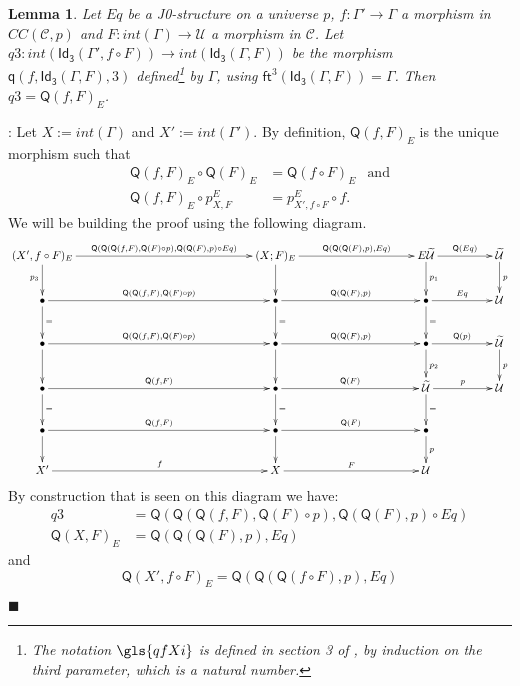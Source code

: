 \documentclass[12pt]{article}
\numberwithin{equation}{section}
\newenvironment{myproof}{{\bf Proof}:}{$\blacksquare$ \vskip 5mm }
\newtheorem{lemma}[proposition]{Lemma}
\newcommand{\sr}{\rightarrow}
\newcommand{\wt}{\widetilde}
\newcommand{\BB}{{\bullet}}
\newcommand{\toCC}{CC} %
\newcommand{\C}{{\mathcal C}}  %
\newcommand{\ft}{\mathsf{ft}}
\newcommand{\q}{\mathsf{q}}
\newcommand{\Idx}{\mathsf{Id_3}} %
\newcommand{\U}{\mathcal{U}}
\newcommand{\Q}{\mathsf{Q}}
\begin{document}
\begin{lemma}
\label{2015.04.04.l4} Let $Eq$ be a J0-structure on a universe $p$,
$f:\Gamma'\sr \Gamma$ a morphism in $\toCC({\C},p)$ and $F:int(\Gamma)\sr \U$ a morphism in $\C$.
Let $q3:int(\Idx(\Gamma',f\circ F))\sr int(\Idx(\Gamma,F))$ be the morphism $\q(f,\Idx(\Gamma,F),3)$ defined\footnote{The notation $\gls{qfXi}$
is defined in section 3 of \cite{Csubsystems}, by induction on the third parameter, which is a natural number.} by
$\Gamma$, using $\ft^3(\Idx(\Gamma,F))=\Gamma$.  Then $q3=\Q(f,F)_{E}$.
\end{lemma}
%
\begin{myproof}
Let $X:=int(\Gamma)$ and $X':=int(\Gamma')$. By definition, $\Q(f,F)_{E}$ is the
unique morphism such that
%
\begin{align*}
  \Q(f,F)_{E}\circ \Q(F)_{E}&=\Q(f\circ F)_{E} & \text{and} \\
  \Q(f,F)_{E}\circ p^{E}_{X,F}&=p^{E}_{X',f\circ F}\circ f.
\end{align*}
%
We will be building the proof using the following diagram.
%
$$
\begin{xy}
          \xymatrix@C=4pc{ (X',f\circ F)_{E} \ar[rrr]^-{\Q(\Q(\Q(f,F),\Q(F)\circ
              p),\Q(\Q(F),p)\circ Eq)} \ar[d]_{p_3} &&& (X;F)_{E}
            \ar[rr]^-{\Q(\Q(\Q(F),p),Eq)} \ar[d] && E\wt{\U} \ar[r]^-{\Q(Eq)}
            \ar[d]^{p_1} & \wt{\U} \ar[d]^{p}\\ \BB
            \ar[rrr]^-{\Q(\Q(f,F),\Q(F)\circ p)} \ar[d]^{=} &&& \BB
            \ar[rr]^-{\Q(\Q(F),p)} \ar[d]^{=} && \BB \ar[r]^-{Eq} \ar[d]^{=}&
            \U\\ \BB \ar[rrr]^-{\Q(\Q(f,F),\Q(F)\circ p)} \ar[d] &&& \BB
            \ar[rr]^-{\Q(\Q(F),p)} \ar[d] && \BB \ar[r]^-{\Q(p)} \ar[d]^{p_2}&
            \wt{\U} \ar[d]^{p}\\ \BB \ar[rrr]^-{\Q(f,F)} \ar[d]^{=}&&& \BB
            \ar[rr]^-{\Q(F)} \ar[d]^{=} && \wt{\U} \ar[r]^-{p} \ar[d]^{=} & \U
            \\ \BB \ar[rrr]^-{\Q(f,F)} \ar[d] &&& \BB \ar[rr]^-{\Q(F)} \ar[d] &&
            \BB \ar[d]^{p}\\ X' \ar[rrr]^-{f} &&& X \ar[rr]^-{F} && \U }
\end{xy}
$$
%
By construction that is seen on this diagram we have:
%
\begin{align*}
  q3&=\Q(\Q(\Q(f,F),\Q(F)\circ p),\Q(\Q(F),p)\circ Eq) \\
  \Q(X,F)_{E}&=\Q(\Q(\Q(F),p),Eq)
\end{align*}
%
and
%
$$\Q(X', f\circ F)_{E}=\Q(\Q(\Q(f\circ F),p),Eq)$$

\end{myproof}
\end{document}

